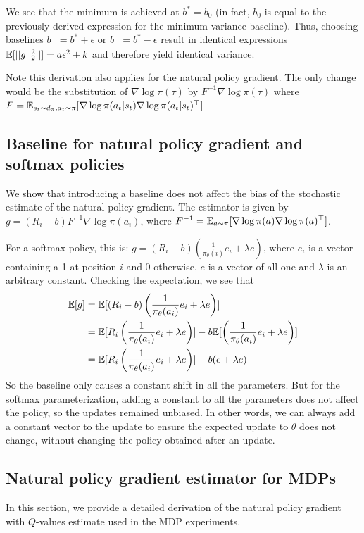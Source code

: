 We see that the minimum is achieved at $b^* = b_0$ (in fact, $b_0$ is equal to the previously-derived expression for the minimum-variance baseline).
Thus, choosing baselines $b_+ = b^* + \epsilon$ or  $b_- = b^* - \epsilon$ result in identical expressions $\mathbb{E} [||g||^2_2 ||] = a \epsilon^2 + k$ and therefore yield identical variance. 

Note this derivation also applies for the natural policy gradient. The only change would be the substitution of $\nabla \log \pi(\tau)$ by $F^{-1} \nabla \log \pi (\tau)$ where $F = \mathbb{E}_{s_t \sim d_\pi, a_t \sim \pi} [\nabla \log \pi(a_t|s_t) \nabla \log \pi(a_t|s_t)^\top]$

\subsection{Baseline for natural policy gradient and softmax policies}
We show that introducing a baseline does not affect the bias of the stochastic estimate of the natural policy gradient. 
The estimator is given by 
$g = (R_i - b) F^{-1} \nabla \log \pi (a_i)$, where $F^{-1} = \mathbb{E}_{a \sim \pi} [\nabla \log \pi(a) \nabla \log \pi(a)^\top]$.

For a softmax policy, this is:
$ g = (R_i - b) (\frac{1}{\pi_\theta(i)}e_i + \lambda e)$, where $e_i$ is a vector containing a 1 at position $i $ and 0 otherwise, $e$ is a vector of all one and $\lambda$ is an arbitrary constant.
Checking the expectation, we see that
\begin{align*}
    \mathbb{E}[g] &= \mathbb{E}[(R_i - b) \left( \frac{1}{\pi_\theta(a_i)}e_i + \lambda e \right)] \\
    &= \mathbb{E}[R_i\left( \frac{1}{\pi_\theta(a_i)}e_i + \lambda e \right)] - b  \mathbb{E}[ \left( \frac{1}{\pi_\theta(a_i)}e_i + \lambda e \right)] \\ 
    &= \mathbb{E}[R_i\left( \frac{1}{\pi_\theta(a_i)}e_i + \lambda e \right)] - b (e + \lambda e) \\
\end{align*}
So the baseline only causes a constant shift in all the parameters. But for the softmax parameterization, adding a constant to all the parameters does not affect the policy, so the updates remained unbiased. In other words, we can always add a constant vector to the update to ensure the expected update to $\theta$ does not change, without changing the policy obtained after an update.

\subsection{Natural policy gradient estimator for MDPs} \label{app:npg_mdp_estimate}
In this section, we provide a detailed derivation of the natural policy gradient with $Q$-values estimate used in the MDP experiments. 

